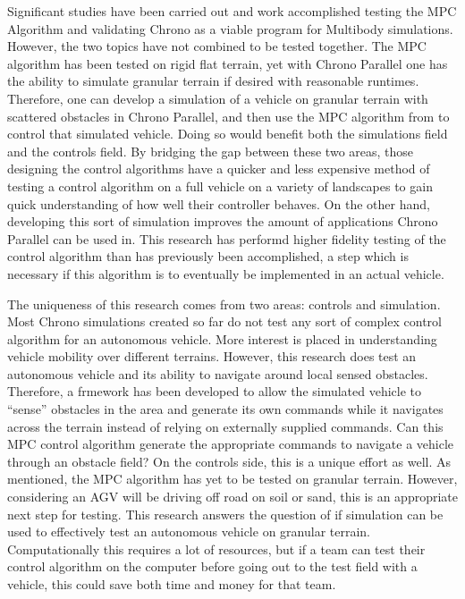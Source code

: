 \documentclass[12pt,onecolumn]{report}
\begin{document}
Significant studies have been carried out and work accomplished testing the MPC Algorithm and validating Chrono as a viable program for Multibody simulations. However, the two topics have not combined to be tested together. The MPC algorithm has been tested on rigid flat terrain, yet with Chrono Parallel one has the ability to simulate granular terrain if desired with reasonable runtimes. Therefore, one can develop a simulation of a vehicle on granular terrain with scattered obstacles in Chrono Parallel, and then use the MPC algorithm from \cite{ModelFidelity2016} to control that simulated vehicle. Doing so would benefit both the simulations field and the controls field. By bridging the gap between these two areas, those designing the control algorithms have a quicker and less expensive method of testing a control algorithm on a full vehicle on a variety of landscapes to gain quick understanding of how well their controller behaves. On the other hand, developing this sort of simulation improves the amount of applications Chrono Parallel can be used in. This research has performd higher fidelity testing of the control algorithm than has previously been accomplished, a step which is necessary if this algorithm is to eventually be implemented in an actual vehicle. 

The uniqueness of this research comes from two areas: controls and simulation. Most Chrono simulations created so far do not test any sort of complex control algorithm for an autonomous vehicle. More interest is placed in understanding vehicle mobility over different terrains. However, this research does test an autonomous vehicle and its ability to navigate around local sensed obstacles. Therefore, a frmework has been developed to allow the simulated vehicle to “sense” obstacles in the area and generate its own commands while it navigates across the terrain instead of relying on externally supplied commands. Can this MPC control algorithm generate the appropriate commands to navigate a vehicle through an obstacle field? On the controls side, this is a unique effort as well. As mentioned, the MPC algorithm has yet to be tested on granular terrain. However, considering an AGV will be driving off road on soil or sand, this is an appropriate next step for testing. This research answers the question of if simulation can be used to effectively test an autonomous vehicle on granular terrain. Computationally this requires a lot of resources, but if a team can test their control algorithm on the computer before going out to the test field with a vehicle, this could save both time and money for that team.
\end{document}
